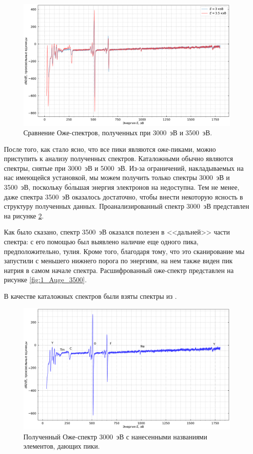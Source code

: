 \documentclass[a4paper, 12pt]{article}
\begin{document}
	\begin{figure}[H]
		\centering
		\includegraphics[width=0.9\linewidth]{1_Auge_double}
		\caption{Сравнение Оже-спектров, полученных при 3000~эВ и 3500~эВ.}
		\label{fig:1_Auge_double}
	\end{figure}

	После того, как стало ясно, что все пики являются оже-пиками, можно приступить к анализу полученных спектров. Каталожными обычно являются спектры, снятые при 3000~эВ и 5000~эВ. Из-за ограничений, накладываемых на нас имеющейся установкой, мы можем получить только спектры 3000~эВ и 3500~эВ, поскольку б\`{о}льшая энергия электронов на недоступна. Тем не менее, даже спектра 3500~эВ оказалось достаточно, чтобы внести некоторую ясность в структуру полученных данных. Проанализированный спектр 3000~эВ представлен на рисунке \ref{fig:1_Auge_3000}.
	
	Как было сказано, спектр 3500~эВ оказался полезен в <<дальней>> части спектра: с его помощью был выявлено наличие еще одного пика, предположительно, тулия. Кроме того, благодаря тому, что это сканирование мы запустили с меньшего нижнего порога по энергиям, на нем также виден пик натрия в самом начале спектра. Расшифрованный оже-спектр представлен на рисунке \ref{fig:1_Auge_3500}. 
	
	В качестве каталожных спектров были взяты спектры из \cite{Auger}.
	
	\begin{figure}[H]
		\centering
		\includegraphics[width=0.9\linewidth]{1_Auge_3000}
		\caption{Полученный Оже-спектр 3000~эВ с нанесенными названиями элементов, дающих пики.}
		\label{fig:1_Auge_3000}
	\end{figure}
	
\end{document}
